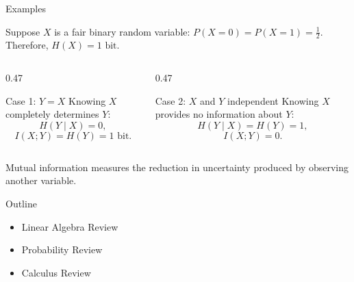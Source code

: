 \documentclass[aspectratio=169,12pt]{beamer}
\begin{document}
\begin{frame}[t]{Examples}
	\vspace{0.2cm}
	
	Suppose $X$ is a fair binary random variable: $
	P(X=0)=P(X=1)=\frac{1}{2}$.
	Therefore, $
	H(X)=1\text{ bit}$.
	
	\begin{columns}[T,onlytextwidth]
		
		\begin{column}{0.47\textwidth}
			\begin{block}{Case 1: $Y=X$}
				Knowing $X$ completely determines $Y$:
				\[
				H(Y\mid X)=0,
				\]
				\[
				I(X;Y)=H(Y)=1\text{ bit}.
				\]
			\end{block}
		\end{column}
		
		\begin{column}{0.47\textwidth}
			\begin{block}{Case 2: $X$ and $Y$ independent}
				Knowing $X$ provides no information about $Y$:
				\[
				H(Y\mid X)=H(Y)=1,
				\]
				\[
				I(X;Y)=0.
				\]
			
			\end{block}
		\end{column}
		
	\end{columns}
	
	\vspace{0.25cm}
	
	\begin{center}
		\small
		Mutual information measures the reduction in uncertainty
		produced by observing another variable.
	\end{center}
\end{frame}


\begin{frame}[t]{Outline}
	\vspace{1.10cm}
	{\fontsize{21}{26}\selectfont
		\begin{itemize}
			\setlength{\itemsep}{0.75cm}
			\item \textcolor{fadedgray}{Linear Algebra Review}
			\item  \textcolor{fadedgray}{Probability Review}
			\item  Calculus Review
	\end{itemize}}
\end{frame}
\end{document}
